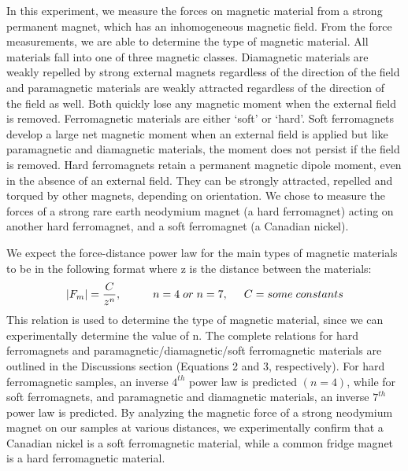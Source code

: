 \documentclass[letterpaper]{article}
\begin{document}
In this experiment, we measure the forces on magnetic material from a strong permanent magnet,
which has an inhomogeneous magnetic field. From the force measurements, we are able to determine the type
of magnetic material. All materials fall into one of three magnetic classes.
Diamagnetic materials are weakly repelled by strong external magnets regardless of the direction of the field and paramagnetic materials are weakly attracted
regardless of the direction of the field as well. Both quickly lose any magnetic moment when the external field is removed. Ferromagnetic materials are either `soft' or `hard'. Soft ferromagnets develop
a large net magnetic moment when an external field is applied but like paramagnetic and diamagnetic materials, the moment does not persist if the field is removed.
Hard ferromagnets retain a permanent magnetic dipole moment, even in the absence of an external field. They can be
strongly attracted, repelled and torqued by other magnets, depending on orientation.
We chose to measure the forces of a strong rare earth neodymium magnet (a hard ferromagnet) acting on
another hard ferromagnet, and a soft ferromagnet (a Canadian nickel).

We expect the force-distance power law for the main types of magnetic materials to be in the following format where z is the distance between the materials:
\begin{equation}
 |F_m|=\frac{C}{z^n}, \hspace{1cm}n=4 \hspace{0.1cm} or \hspace{0.1cm} n=7,\hspace{0.5cm} C=some\hspace{0.1cm}constants
\end{equation}
This relation is used to determine the type of magnetic material, since we can experimentally determine the value of n.
The complete relations for hard ferromagnets and paramagnetic/diamagnetic/soft ferromagnetic materials are outlined
in the Discussions section (Equations 2 and 3, respectively).
For hard ferromagnetic samples, an inverse $4^{th}$ power law is predicted $(n=4)$, while for soft ferromagnets, and paramagnetic and diamagnetic materials,
an inverse $7^{th}$ power law is predicted. By analyzing the magnetic force of a strong neodymium magnet on our
samples at various distances, we experimentally confirm that a Canadian nickel is a soft ferromagnetic material, while
a common fridge magnet is a hard ferromagnetic material.

\end{document}
